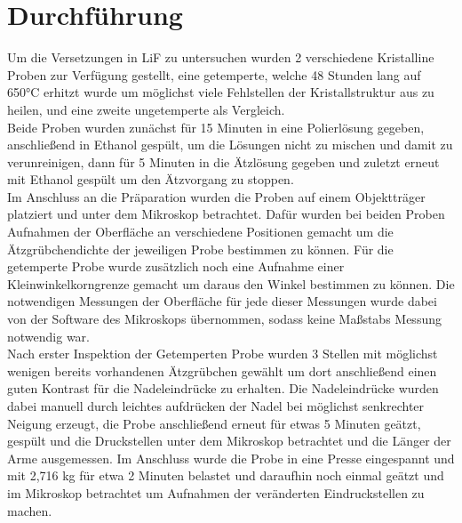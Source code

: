 \section{Durchführung}
	Um die Versetzungen in LiF zu untersuchen wurden 2 verschiedene Kristalline Proben zur Verfügung gestellt, eine getemperte, welche 48 Stunden lang auf 650°C erhitzt wurde um möglichst viele Fehlstellen der Kristallstruktur
	aus zu heilen, und eine zweite ungetemperte als Vergleich.\\
	Beide Proben wurden zunächst für 15 Minuten in eine Polierlösung gegeben, anschließend in Ethanol gespült, um die Lösungen nicht zu mischen und damit zu verunreinigen, 
	dann für 5 Minuten in die Ätzlösung gegeben und zuletzt erneut mit Ethanol gespült um den Ätzvorgang zu stoppen.\\
	Im Anschluss an die Präparation wurden die Proben auf einem Objektträger platziert und unter dem Mikroskop betrachtet. Dafür wurden bei beiden Proben 
	Aufnahmen der Oberfläche an verschiedene Positionen gemacht um die Ätzgrübchendichte der jeweiligen Probe bestimmen zu können. Für die getemperte Probe wurde 
	zusätzlich noch eine Aufnahme einer Kleinwinkelkorngrenze gemacht um daraus den Winkel bestimmen zu können. Die notwendigen Messungen der Oberfläche für jede dieser
	Messungen wurde dabei von der Software des Mikroskops übernommen, sodass keine Maßstabs Messung notwendig war.\\
	Nach erster Inspektion der Getemperten Probe wurden 3 Stellen mit möglichst wenigen bereits vorhandenen Ätzgrübchen gewählt um dort anschließend einen guten Kontrast für die Nadeleindrücke zu erhalten.
	Die Nadeleindrücke wurden dabei manuell durch leichtes aufdrücken der Nadel bei möglichst senkrechter Neigung erzeugt, die Probe anschließend erneut für etwas 5 Minuten geätzt, gespült und die Druckstellen unter
	dem Mikroskop betrachtet und die Länger der Arme ausgemessen.
	Im Anschluss wurde die Probe in eine Presse eingespannt und mit 2,716 kg für etwa 2 Minuten belastet und daraufhin noch einmal geätzt und im Mikroskop betrachtet um Aufnahmen der veränderten Eindruckstellen zu machen. 